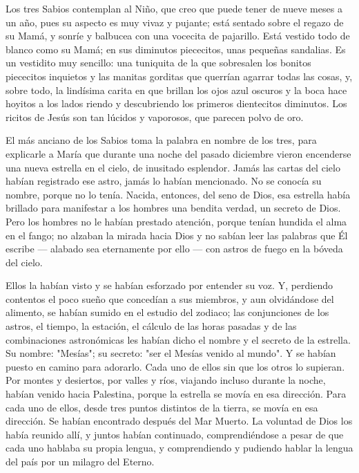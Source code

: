 \documentclass[12pt, twoside, openright]{book} %
\begin{document}
Los tres Sabios contemplan al Niño, que creo que puede tener de nueve meses a un año, pues su aspecto es muy vivaz y pujante; está sentado sobre el regazo de su Mamá, y sonríe y balbucea con una vocecita de pajarillo. Está vestido todo de blanco como su Mamá; en sus diminutos piececitos, unas pequeñas sandalias. Es un vestidito muy sencillo: una tuniquita de la que sobresalen los bonitos piececitos inquietos y las manitas gorditas que querrían agarrar todas las cosas, y, sobre todo, la lindísima carita en que brillan los ojos azul oscuros y la boca hace hoyitos a los lados riendo y descubriendo los primeros dientecitos diminutos. Los ricitos de Jesús son tan lúcidos y vaporosos, que parecen polvo de oro. 

El más anciano de los Sabios toma la palabra en nombre de los tres, para explicarle a María que durante una noche del pasado diciembre vieron encenderse una nueva estrella en el cielo, de inusitado esplendor. Jamás las cartas del cielo habían registrado ese astro, jamás lo habían mencionado. No se conocía su nombre, porque no lo tenía. Nacida, entonces, del seno de Dios, esa estrella había brillado para manifestar a los hombres una bendita verdad, un secreto de Dios. Pero los hombres no le habían prestado atención, porque tenían hundida el alma en el fango; no alzaban la mirada hacia Dios y no sabían leer las palabras que Él escribe — alabado sea eternamente por ello — con astros de fuego en la bóveda del cielo. 

Ellos la habían visto y se habían esforzado por entender su voz. Y, perdiendo contentos el poco sueño que concedían a sus miembros, y aun olvidándose del alimento, se habían sumido en el estudio del zodiaco; las conjunciones de los astros, el tiempo, la estación, el cálculo de las horas pasadas y de las combinaciones astronómicas les habían dicho el nombre y el secreto de la estrella. Su nombre: "Mesías"; su secreto: "ser el Mesías venido al mundo". Y se habían puesto en camino para adorarlo. Cada uno de ellos sin que los otros lo supieran. Por montes y desiertos, por valles y ríos, viajando incluso durante la noche, habían venido hacia Palestina, porque la estrella se movía en esa dirección. Para cada uno de ellos, desde tres puntos distintos de la tierra, se movía en esa dirección. Se habían encontrado después del Mar Muerto. La voluntad de Dios los había reunido allí, y juntos habían continuado, comprendiéndose a pesar de que cada uno hablaba su propia lengua, y comprendiendo y pudiendo hablar la lengua del país por un milagro del Eterno. 
\end{document}
